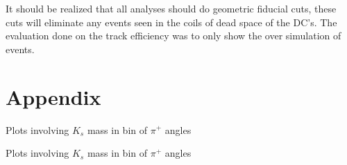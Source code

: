 \documentclass[10pt,a4paper]{article}
\def\pip{$\pi^+$ }
\def\Ks{$K_s$ }
\begin{document}
\begin{enumerate}
    It should be realized that all analyses should do geometric fiducial cuts, these cuts will eliminate any events seen in the coils of dead space of the DC's. The evaluation done on the track efficiency was to only show the over simulation of events.
  	\end{enumerate}
  \section{Appendix}
  Plots involving \Ks mass in bin of \pip angles
  	 
  Plots involving \Ks mass in bin of \pip angles
  	 
\end{document}
